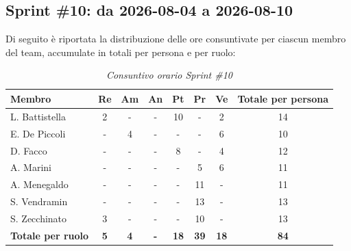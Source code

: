 ﻿\documentclass[a4paper, 10pt, colorlinks=true, linkcolor=black, urlcolor=blue, citecolor=blue, hidelinks]{article}
\renewcommand{\arraystretch}{1.2}
\begin{document}
\subsection{Sprint \#10: da 2026-08-04 a 2026-08-10}
Di seguito è riportata la distribuzione delle ore consuntivate per ciascun membro del team, accumulate in totali per persona e per ruolo:

\begin{table}[H]
    \centering
    \renewcommand{\arraystretch}{1.4}
    \begin{tabular}{|l|c|c|c|c|c|c|c|}
        \hline
        \rowcolor{bluBitless!15}
        \textbf{Membro} & \textbf{Re} & \textbf{Am} & \textbf{An} & \textbf{Pt} & \textbf{Pr} & \textbf{Ve} & \textbf{Totale per persona} \\
        \hline
        L. Battistella & 2 & - & - & 10 & - & 2 & 14 \\ \hline
        E. De Piccoli & - & 4 & - & - & - & 6 & 10 \\ \hline
        D. Facco & - & - & - & 8 & - & 4 & 12 \\ \hline
        A. Marini & - & - & - & - & 5 & 6 & 11 \\ \hline
        A. Menegaldo & - & - & - & - & 11 & - & 11 \\ \hline
        S. Vendramin & - & - & - & - & 13 & - & 13 \\ \hline
        S. Zecchinato & 3 & - & - & - & 10 & - & 13 \\ \hline
        \rowcolor{bluBitless!8}
        \textbf{Totale per ruolo} & \textbf{5} & \textbf{4} & \textbf{-} & \textbf{18} & \textbf{39} & \textbf{18} & \textbf{84} \\
        \hline
    \end{tabular}
    \caption{\textit{Consuntivo orario Sprint \#10}}
\end{table}
\end{document}
